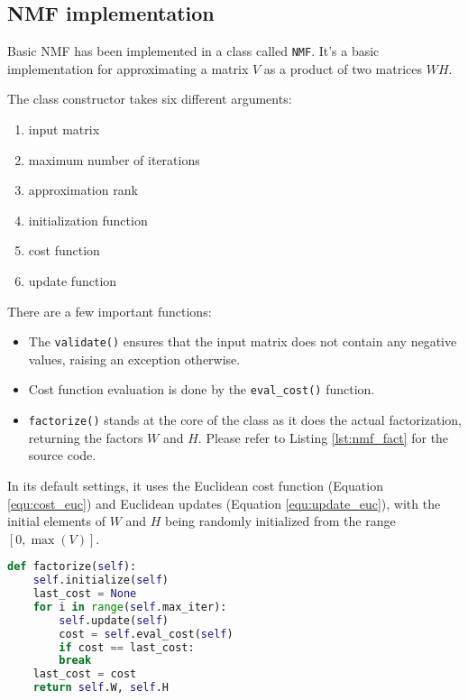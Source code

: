\subsection{NMF implementation}
Basic NMF has been implemented in a class called \verb|NMF|. It's a basic implementation for approximating a matrix $V$ as a product of two matrices $WH$.

The class constructor takes six different arguments:

\begin{enumerate}
	\item input matrix
	\item maximum number of iterations
	\item approximation rank
	\item initialization function
	\item cost function
	\item update function
\end{enumerate}

There are a few important functions:

\begin{itemize}
\item The \verb|validate()| ensures that the input matrix does not contain any negative values, raising an exception otherwise.
\item Cost function evaluation is done by the \verb|eval_cost()| function.
\item \verb|factorize()| stands at the core of the class as it does the actual factorization, returning the factors $W$ and $H$. Please refer to Listing \ref{lst:nmf_fact} for the source code.
\end{itemize}

In its default settings, it uses the Euclidean cost function (Equation \ref{equ:cost_euc}) and Euclidean updates (Equation \ref{equ:update_euc}), with the initial elements of $W$ and $H$ being randomly initialized from the range $[0, \max(V)]$.

\begin{minipage}{\linewidth}
\begin{lstlisting}[caption={Python code for the factorize function}, language=Python, label={lst:nmf_fact}]
def factorize(self):
	self.initialize(self)
	last_cost = None
	for i in range(self.max_iter):
		self.update(self)
		cost = self.eval_cost(self)
		if cost == last_cost:
		break
	last_cost = cost
	return self.W, self.H
\end{lstlisting}
\end{minipage}

